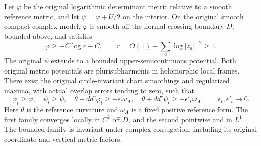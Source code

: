 \begin{proposition}
\label{prop:actual-cusp-smoothing}
Let $\varphi$ be the original logarithmic determinant metric relative
to a smooth reference metric, and let
$\psi=\varphi+U/2$ on the interior.  On the original smooth compact
complex model, $\varphi$ is smooth off the normal-crossing boundary
$D$, bounded above, and satisfies
\[
       \varphi\ge-C\log r-C,
       \qquad r=O(1)+\sum_{a}\log|z_a|^{-2}\ge1.
 \tag{HA5}
\]
The original $\psi$ extends to a bounded upper-semicontinuous
potential.  Both original metric potentials are plurisubharmonic
in holomorphic local frames.  There exist the original circle-invariant
chart smoothings and regularized maxima, with actual overlap errors
tending to zero, such that
\[
 \varphi_t\ge\varphi,\quad \psi_t\ge\psi,\quad
 \theta+dd^c\varphi_t\ge-\epsilon_t\omega_A,\quad
 \theta+dd^c\psi_t\ge-\epsilon'_t\omega_A,
 \qquad\epsilon_t,\epsilon'_t\longrightarrow0.
 \tag{HA6}
\]
Here $\theta$ is the reference curvature and $\omega_A$ is a fixed
positive reference form.  The first family converges locally in
$C^2$ off $D$, and the second pointwise and in $L^1$.  The bounded
family is invariant under complex conjugation, including its
original coordinate and vertical metric factors.
\end{proposition}


